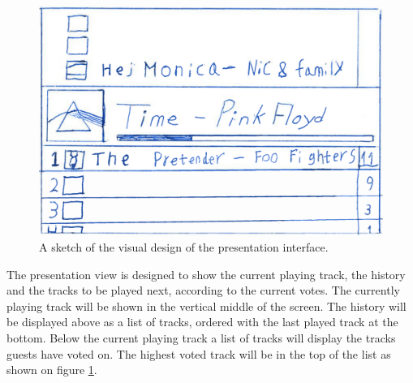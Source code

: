 \begin{figure}[hbtp]
  \centering
  \includegraphics[width=1.0\linewidth]{Images/presentationInterface.png}
  \caption{A sketch of the visual design of the presentation interface.}\label{fig:presentation}
\end{figure}

The presentation view is designed to show the current playing track, the history and the tracks to be played next, according to the current votes. The currently playing track will be shown in the vertical middle of the screen. The history will be displayed above as a list of tracks, ordered with the last played track at the bottom. Below the current playing track a list of tracks will display the tracks guests have voted on. The highest voted track will be in the top of the list as shown on figure \cref{fig:presentation}. 

